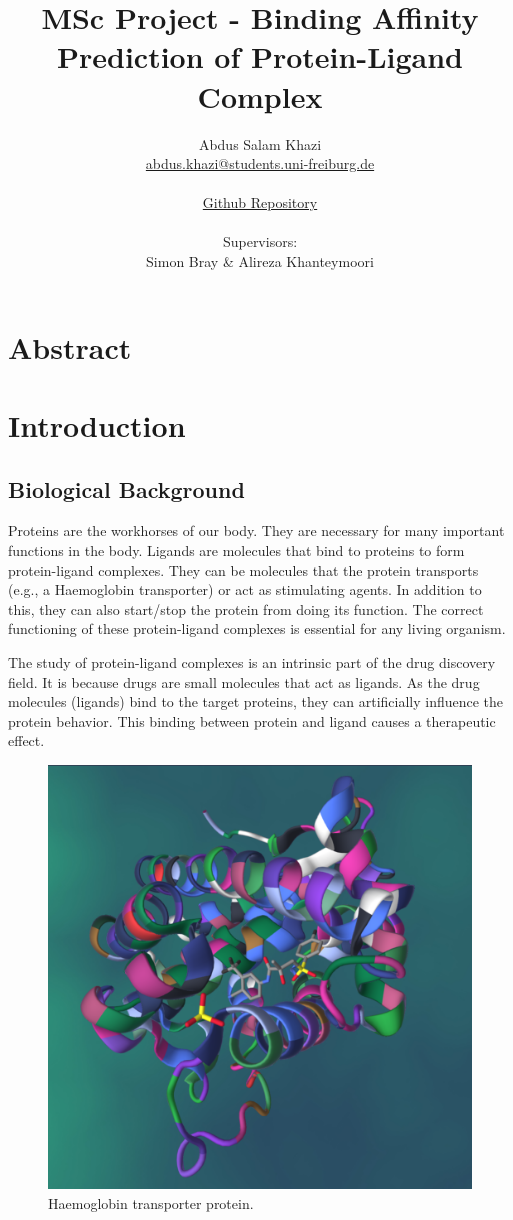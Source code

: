 \documentclass[11pt]{article}
\title{MSc Project - Binding Affinity Prediction of Protein-Ligand Complex}
\author{
        Abdus Salam Khazi\\
        \href{mailto:abdus.khazi@students.uni-freiburg.de}
                {abdus.khazi@students.uni-freiburg.de}\\ \\
        \href{https://github.com/abduskhazi/MSc-Project}
                {Github Repository} \cite{github_repository} \\ \\
        Supervisors:
        \begin{tabular}{ll}
			Simon Bray \&
			Alireza Khanteymoori
		\end{tabular}
       }
\begin{document}
\maketitle
\date{}
\tableofcontents
\newpage

\section{Abstract}
\newpage

\section{Introduction}

\subsection{Biological Background}
Proteins are the workhorses of our body.  They are necessary for many important functions in the body.  Ligands are molecules that bind to proteins to form protein-ligand complexes.  They can be molecules that the protein transports (e.g., a Haemoglobin transporter) or act as stimulating agents.  In addition to this, they can also start/stop the protein from doing its function.  The correct functioning of these protein-ligand complexes is essential for any living organism.

The study of protein-ligand complexes is an intrinsic part of the drug discovery field.  It is because drugs are small molecules that act as ligands.  As the drug molecules (ligands) bind to the target proteins, they can artificially influence the protein behavior.  This binding between protein and ligand causes a therapeutic effect.

\begin{figure}[htb]
  \centering
    \includegraphics[scale=0.15]{images/pl_complex}
    \caption{Haemoglobin transporter protein.  \cite{PL_complex_introduction}}
    \label{fig:HaemoglobinTransporterImage}
\end{figure}
\end{document}
